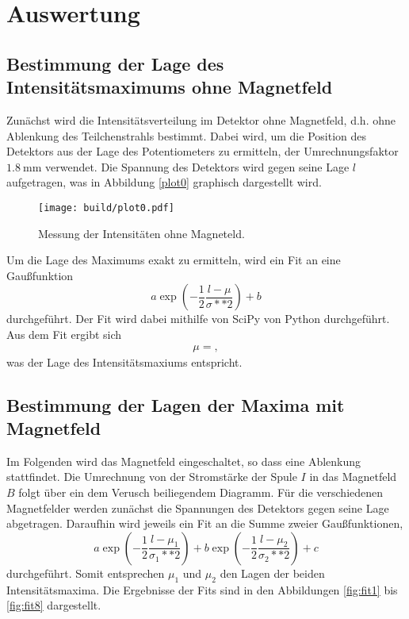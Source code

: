 \section{Auswertung}
\label{sec:Auswertung}
\subsection{Bestimmung der Lage des Intensitätsmaximums ohne Magnetfeld}

Zunächst wird die Intensitätsverteilung im Detektor ohne Magnetfeld, d.h. ohne Ablenkung des Teilchenstrahls bestimmt.
Dabei wird, um die Position des Detektors aus der Lage des Potentiometers zu ermitteln, der Umrechnungsfaktor $\SI{1.8}{\milli\metre}$ verwendet.
Die Spannung des Detektors wird gegen seine Lage $l$ aufgetragen, was in Abbildung \ref{plot0} graphisch dargestellt wird.
\begin{figure}
  \centering
  \texttt{[image: build/plot0.pdf]}
  \caption{Messung der Intensitäten ohne Magneteld.}
  \label{fig:plot0}
\end{figure}
Um die Lage des Maximums exakt zu ermitteln, wird ein Fit an eine Gaußfunktion
\begin{equation}
  a \exp{\left( -\frac{1}{2} \frac{l - \mu}{\sigma**2} \right)} + b
\end{equation}
durchgeführt.
Der Fit wird dabei mithilfe von SciPy von Python durchgeführt.
Aus dem Fit ergibt sich
\begin{align*}
  \mu = ,
\end{align*}
was der Lage des Intensitätsmaxiums entspricht.

\subsection{Bestimmung der Lagen der Maxima mit Magnetfeld}
Im Folgenden wird das Magnetfeld eingeschaltet, so dass eine Ablenkung stattfindet.
Die Umrechnung von der Stromstärke der Spule $I$ in das Magnetfeld $B$ folgt über ein dem Verusch beiliegendem Diagramm.
Für die verschiedenen Magnetfelder werden zunächst die Spannungen des Detektors gegen seine Lage abgetragen.
Daraufhin wird jeweils ein Fit an die Summe zweier Gaußfunktionen,
\begin{equation}
  a \exp{\left( -\frac{1}{2} \frac{l - \mu_1}{\sigma_1**2} \right)} +  b \exp{\left( -\frac{1}{2} \frac{l - \mu_2}{\sigma_2**2} \right)} + c
\end{equation}
durchgeführt.
Somit entsprechen $\mu_1$ und $\mu_2$ den Lagen der beiden Intensitätsmaxima.
Die Ergebnisse der Fits sind in den Abbildungen \ref{fig:fit1} bis \ref{fig:fit8} dargestellt.

